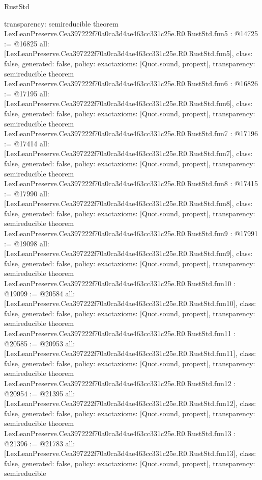 \begin{lexlean}{RustStd}
\begin{coremodule}
{  transparency: semireducible
}
theorem LexLeanPreserve.Cea397222f70a0ca3d4ae463cc331c25e.R0.RustStd.fun5 : @14725 := @16825 {
  all: [LexLeanPreserve.Cea397222f70a0ca3d4ae463cc331c25e.R0.RustStd.fun5],
  class: false,
  generated: false,
  policy: exact{axioms: [Quot.sound, propext]},
  transparency: semireducible
}
theorem LexLeanPreserve.Cea397222f70a0ca3d4ae463cc331c25e.R0.RustStd.fun6 : @16826 := @17195 {
  all: [LexLeanPreserve.Cea397222f70a0ca3d4ae463cc331c25e.R0.RustStd.fun6],
  class: false,
  generated: false,
  policy: exact{axioms: [Quot.sound, propext]},
  transparency: semireducible
}
theorem LexLeanPreserve.Cea397222f70a0ca3d4ae463cc331c25e.R0.RustStd.fun7 : @17196 := @17414 {
  all: [LexLeanPreserve.Cea397222f70a0ca3d4ae463cc331c25e.R0.RustStd.fun7],
  class: false,
  generated: false,
  policy: exact{axioms: [Quot.sound, propext]},
  transparency: semireducible
}
theorem LexLeanPreserve.Cea397222f70a0ca3d4ae463cc331c25e.R0.RustStd.fun8 : @17415 := @17990 {
  all: [LexLeanPreserve.Cea397222f70a0ca3d4ae463cc331c25e.R0.RustStd.fun8],
  class: false,
  generated: false,
  policy: exact{axioms: [Quot.sound, propext]},
  transparency: semireducible
}
theorem LexLeanPreserve.Cea397222f70a0ca3d4ae463cc331c25e.R0.RustStd.fun9 : @17991 := @19098 {
  all: [LexLeanPreserve.Cea397222f70a0ca3d4ae463cc331c25e.R0.RustStd.fun9],
  class: false,
  generated: false,
  policy: exact{axioms: [Quot.sound, propext]},
  transparency: semireducible
}
theorem LexLeanPreserve.Cea397222f70a0ca3d4ae463cc331c25e.R0.RustStd.fun10 : @19099 := @20584 {
  all: [LexLeanPreserve.Cea397222f70a0ca3d4ae463cc331c25e.R0.RustStd.fun10],
  class: false,
  generated: false,
  policy: exact{axioms: [Quot.sound, propext]},
  transparency: semireducible
}
theorem LexLeanPreserve.Cea397222f70a0ca3d4ae463cc331c25e.R0.RustStd.fun11 : @20585 := @20953 {
  all: [LexLeanPreserve.Cea397222f70a0ca3d4ae463cc331c25e.R0.RustStd.fun11],
  class: false,
  generated: false,
  policy: exact{axioms: [Quot.sound, propext]},
  transparency: semireducible
}
theorem LexLeanPreserve.Cea397222f70a0ca3d4ae463cc331c25e.R0.RustStd.fun12 : @20954 := @21395 {
  all: [LexLeanPreserve.Cea397222f70a0ca3d4ae463cc331c25e.R0.RustStd.fun12],
  class: false,
  generated: false,
  policy: exact{axioms: [Quot.sound, propext]},
  transparency: semireducible
}
theorem LexLeanPreserve.Cea397222f70a0ca3d4ae463cc331c25e.R0.RustStd.fun13 : @21396 := @21783 {
  all: [LexLeanPreserve.Cea397222f70a0ca3d4ae463cc331c25e.R0.RustStd.fun13],
  class: false,
  generated: false,
  policy: exact{axioms: [Quot.sound, propext]},
  transparency: semireducible
}
\end{coremodule}
\end{lexlean}
